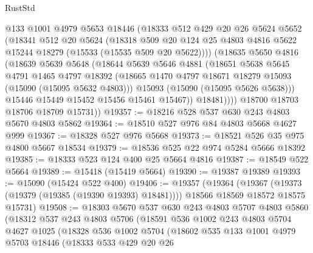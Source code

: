 \begin{lexlean}{RustStd}
\begin{coremodule}
            @133
            @1001
            @4979
            @5653
            @18446
            (@18333
              @512
              @429
              @20
              @26
              @5624
              @5652
              (@18341
                @512
                @20
                @5624
                (@18318
                  @509
                  @20
                  @124
                  @25
                  @4803
                  @4816
                  @5622
                  @15244
                  @18279
                  (@15533 (@15535 @509 @20 @5622))))
              (@18635
                @5650
                @4816
                (@18639
                  @5639
                  @5648
                  (@18644
                    @5639
                    @5646
                    @4881
                    (@18651
                      @5638
                      @5645
                      @4791
                      @1465
                      @4797
                      @18392
                      (@18665 @1470 @4797 @18671 @18279 @15093 (@15090 (@15095 @5632 @4803)))
                      @15093
                      (@15090 (@15095 @5626 @5638)))
                    @15446
                    @15449
                    @15452
                    @15456
                    @15461
                    @15467))
                @18481))))
        @18700
        @18703
        @18706
        @18709
        @15731))
@19357 := @18216 @528 @537 @630 @243 @4803 @5670 @4803 @5862
@19364 := @18510 @527 @976 @84 @4803 @5668 @4627 @999
@19367 := @18328 @527 @976 @5668
@19373 := @18521 @526 @35 @975 @4800 @5667 @18534
@19379 := @18536 @525 @22 @974 @5284 @5666 @18392
@19385 := @18333 @523 @124 @400 @25 @5664 @4816
@19387 := @18549 @522 @5664
@19389 := @15418 (@15419 @5664)
@19390 := @19387 @19389
@19393 := @15090 (@15424 @522 @400)
@19406 := @19357
    (@19364
      (@19367 (@19373 (@19379 (@19385 (@19390 @19393) @18481))))
      @18566
      @18569
      @18572
      @18575
      @15731)
@19508 := @18303
    @5670
    @537
    @630
    @243
    @4803
    @5707
    @4803
    @5860
    (@18312
      @537
      @243
      @4803
      @5706
      (@18591
        @536
        @1002
        @243
        @4803
        @5704
        @4627
        @1025
        (@18328
          @536
          @1002
          @5704
          (@18602
            @535
            @133
            @1001
            @4979
            @5703
            @18446
            (@18333
              @533
              @429
              @20
              @26

\end{coremodule}
\end{lexlean}
